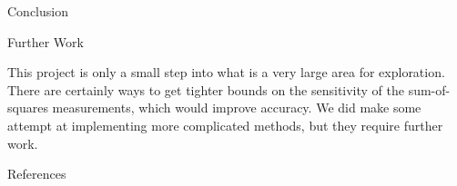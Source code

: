 \documentclass[final]{beamer}
\newlength{\onecolwid}
\begin{document}
\begin{frame}[t]
\begin{columns}[t]
\begin{column}{\onecolwid}
\begin{block}{Conclusion}
\end{block}


\begin{block}{Further Work}

This project is only a small step into what is a very large area for exploration. There are 
certainly ways to get tighter bounds on the sensitivity of the sum-of-squares measurements, 
which would improve accuracy. We did make some attempt at implementing more complicated 
methods, but they require further work.

\end{block}


\begin{block}{References}




\end{block}


\end{column} %

\end{columns} %

\end{frame} %
\end{document}
